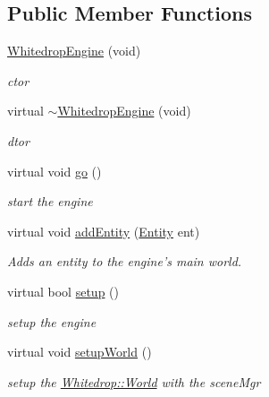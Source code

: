 \subsection*{Public Member Functions}
\begin{DoxyCompactItemize}
\item 
\hypertarget{class_whitedrop_1_1_whitedrop_engine_a37c2e78e6455aac14c4d895064968338}{\hyperlink{class_whitedrop_1_1_whitedrop_engine_a37c2e78e6455aac14c4d895064968338}{Whitedrop\+Engine} (void)}\label{class_whitedrop_1_1_whitedrop_engine_a37c2e78e6455aac14c4d895064968338}

\begin{DoxyCompactList}\small\item\em ctor \end{DoxyCompactList}\item 
\hypertarget{class_whitedrop_1_1_whitedrop_engine_a2220b661479015296674d98daed93706}{virtual \hyperlink{class_whitedrop_1_1_whitedrop_engine_a2220b661479015296674d98daed93706}{$\sim$\+Whitedrop\+Engine} (void)}\label{class_whitedrop_1_1_whitedrop_engine_a2220b661479015296674d98daed93706}

\begin{DoxyCompactList}\small\item\em dtor \end{DoxyCompactList}\item 
virtual void \hyperlink{class_whitedrop_1_1_whitedrop_engine_a27ed842de5918bd517bcbd34ef5894e0}{go} ()
\begin{DoxyCompactList}\small\item\em start the engine \end{DoxyCompactList}\item 
virtual void \hyperlink{class_whitedrop_1_1_whitedrop_engine_aae84b263238d884cfd42b0ee7eb798c8}{add\+Entity} (\hyperlink{class_whitedrop_1_1_entity}{Entity} ent)
\begin{DoxyCompactList}\small\item\em Adds an entity to the engine's main world. \end{DoxyCompactList}\item 
virtual bool \hyperlink{class_whitedrop_1_1_whitedrop_engine_a5305c72da4845afb7ac7ffcc5d6c3d8a}{setup} ()
\begin{DoxyCompactList}\small\item\em setup the engine \end{DoxyCompactList}\item 
virtual void \hyperlink{class_whitedrop_1_1_whitedrop_engine_a6a94009eb6a017afd1cb8014fc042b4f}{setup\+World} ()
\begin{DoxyCompactList}\small\item\em setup the \hyperlink{class_whitedrop_1_1_world}{Whitedrop\+::\+World} with the scene\+Mgr \end{DoxyCompactList}\end{DoxyCompactItemize}
